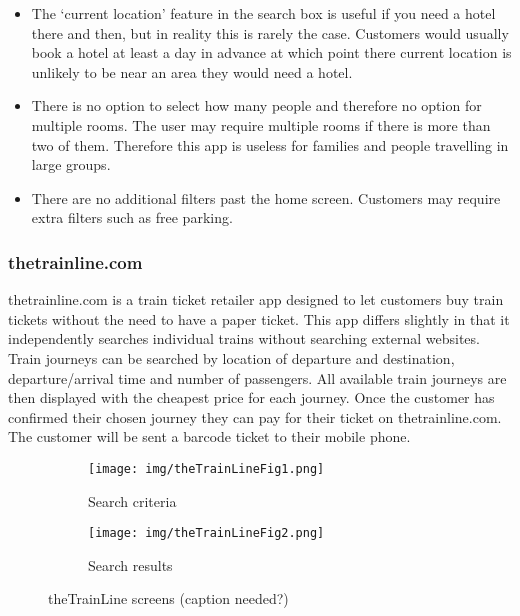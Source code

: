 \begin{itemize}
	\item The `current location' feature in the search box is useful if you
		need a hotel there and then, but in reality this is rarely the case.
		Customers would usually book a hotel at least a day in advance at which
		point there current location is unlikely to be near an area they would
		need a hotel.
	\item There is no option to select how many people and therefore no option
		for multiple rooms. The user may require multiple rooms if there is
		more than two of them. Therefore this app is useless for families and
		people travelling in large groups.
	\item There are no additional filters past the home screen. Customers may
		require extra filters such as free parking.
\end{itemize}

\subsubsection{thetrainline.com}
\label{ssub:thetrainline}

thetrainline.com is a train ticket retailer app designed to let customers buy
train tickets without the need to have a paper ticket. This app differs
slightly in that it independently searches individual trains without searching
external websites. Train journeys can be searched by location of departure and
destination, departure/arrival  time and number of passengers. All available
train journeys are then displayed with the cheapest price for each journey.
Once the customer has confirmed their chosen journey they can pay for their
ticket on thetrainline.com. The customer will be sent a barcode ticket to their
mobile phone.
\begin{figure}[ht]
    \centering
    \begin{subfigure}[b]{0.2\textwidth}
        \texttt{[image: img/theTrainLineFig1.png]}
        \caption{Search criteria}
    \end{subfigure}%
    \qquad
    \begin{subfigure}[b]{0.2\textwidth}
        \texttt{[image: img/theTrainLineFig2.png]}
        \caption{Search results}
    \end{subfigure}
    \caption{theTrainLine screens (caption needed?)}\label{fig:thetrainline1}
\end{figure}


